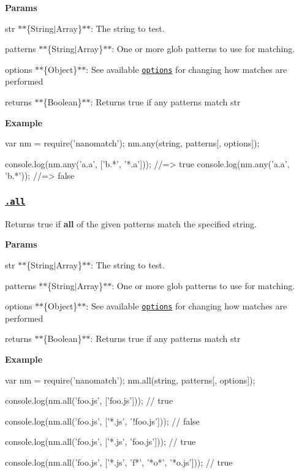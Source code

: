 {\bfseries Params}


\begin{DoxyItemize}
\item {\ttfamily str} $\ast$$\ast$\{String$\vert$\+Array\}$\ast$$\ast$\+: The string to test.
\item {\ttfamily patterns} $\ast$$\ast$\{String$\vert$\+Array\}$\ast$$\ast$\+: One or more glob patterns to use for matching.
\item {\ttfamily options} $\ast$$\ast$\{Object\}$\ast$$\ast$\+: See available \href{#options}{\tt options} for changing how matches are performed
\item {\ttfamily returns} $\ast$$\ast$\{Boolean\}$\ast$$\ast$\+: Returns true if any patterns match {\ttfamily str}
\end{DoxyItemize}

{\bfseries Example}


\begin{DoxyCode}
var nm = require('nanomatch');
nm.any(string, patterns[, options]);

console.log(nm.any('a.a', ['b.*', '*.a']));
//=> true
console.log(nm.any('a.a', 'b.*'));
//=> false
\end{DoxyCode}


\subsubsection*{\href{index.js#L325}{\tt .all}}

Returns true if {\bfseries all} of the given {\ttfamily patterns} match the specified string.

{\bfseries Params}


\begin{DoxyItemize}
\item {\ttfamily str} $\ast$$\ast$\{String$\vert$\+Array\}$\ast$$\ast$\+: The string to test.
\item {\ttfamily patterns} $\ast$$\ast$\{String$\vert$\+Array\}$\ast$$\ast$\+: One or more glob patterns to use for matching.
\item {\ttfamily options} $\ast$$\ast$\{Object\}$\ast$$\ast$\+: See available \href{#options}{\tt options} for changing how matches are performed
\item {\ttfamily returns} $\ast$$\ast$\{Boolean\}$\ast$$\ast$\+: Returns true if any patterns match {\ttfamily str}
\end{DoxyItemize}

{\bfseries Example}


\begin{DoxyCode}
var nm = require('nanomatch');
nm.all(string, patterns[, options]);

console.log(nm.all('foo.js', ['foo.js']));
// true

console.log(nm.all('foo.js', ['*.js', '!foo.js']));
// false

console.log(nm.all('foo.js', ['*.js', 'foo.js']));
// true

console.log(nm.all('foo.js', ['*.js', 'f*', '*o*', '*o.js']));
// true
\end{DoxyCode}


